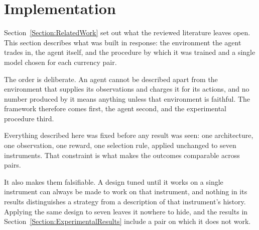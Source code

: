 \section{Implementation}
\label{Section:Implementation}

Section~\ref{Section:RelatedWork} set out what the reviewed literature leaves open. This section describes what was built in response: the environment the agent trades in, the agent itself, and the procedure by which it was trained and a single model chosen for each currency pair.

The order is deliberate. An agent cannot be described apart from the environment that supplies its observations and charges it for its actions, and no number produced by it means anything unless that environment is faithful. The framework therefore comes first, the agent second, and the experimental procedure third.







Everything described here was fixed before any result was seen: one architecture, one observation, one reward, one selection rule, applied unchanged to seven instruments. That constraint is what makes the outcomes comparable across pairs.

It also makes them falsifiable. A design tuned until it works on a single instrument can always be made to work on that instrument, and nothing in its results distinguishes a strategy from a description of that instrument's history. Applying the same design to seven leaves it nowhere to hide, and the results in Section~\ref{Section:ExperimentalResults} include a pair on which it does not work.